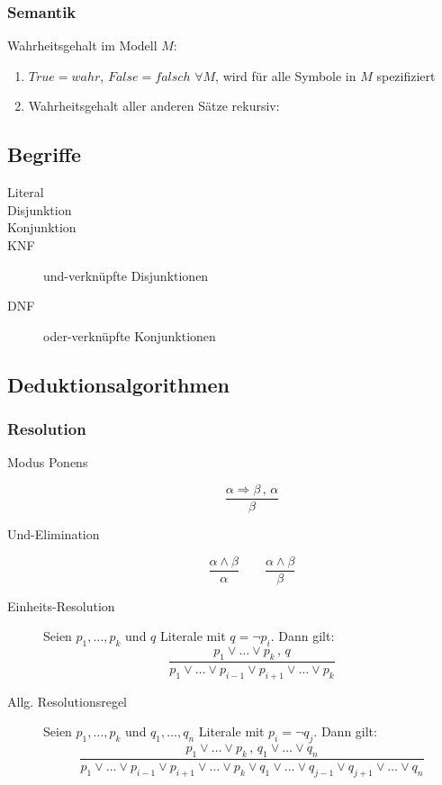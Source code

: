 \subsubsection*{Semantik}
Wahrheitsgehalt im Modell $M$:
\begin{enumerate}
\item $True = wahr$, $False = falsch$ $\forall M$, wird für alle Symbole in $M$ spezifiziert
\item Wahrheitsgehalt aller anderen Sätze rekursiv:
\end{enumerate}

\subsection{Begriffe}

\begin{description}
	\item[Literal]
	\item[Disjunktion]
	\item[Konjunktion]
	\item[KNF] und-verknüpfte Disjunktionen
	\item[DNF] oder-verknüpfte Konjunktionen
\end{description}

\subsection{Deduktionsalgorithmen}

\subsubsection{Resolution}

\begin{description}
	\item[Modus Ponens] $$\frac{\alpha \Rightarrow \beta \, , \, \alpha}{\beta}$$
	\item[Und-Elimination] $$\frac{\alpha \wedge \beta}{\alpha} \qquad \frac{\alpha \wedge \beta}{\beta}$$
	\item[Einheits-Resolution] Seien $p_1,\dots,p_k$ und $q$ Literale mit $q = \neg p_i$. Dann gilt: $$\frac{p_1 \vee \dots \vee p_k \, , \, q}{p_1 \vee \dots \vee p_{i-1} \vee p_{i+1} \vee \dots \vee p_k}$$
	\item[Allg. Resolutionsregel] Seien $p_1,\dots,p_k$ und $q_1,\dots,q_n$ Literale mit $p_i = \neg q_j$. Dann gilt: $$\frac{p_1 \vee \dots \vee p_k \, , \, q_1 \vee \dots \vee q_n}{p_1 \vee \dots \vee p_{i-1} \vee p_{i+1} \vee \dots \vee p_k \vee q_1 \vee \dots \vee q_{j-1} \vee q_{j+1} \vee \dots \vee q_n}$$
\end{description}

